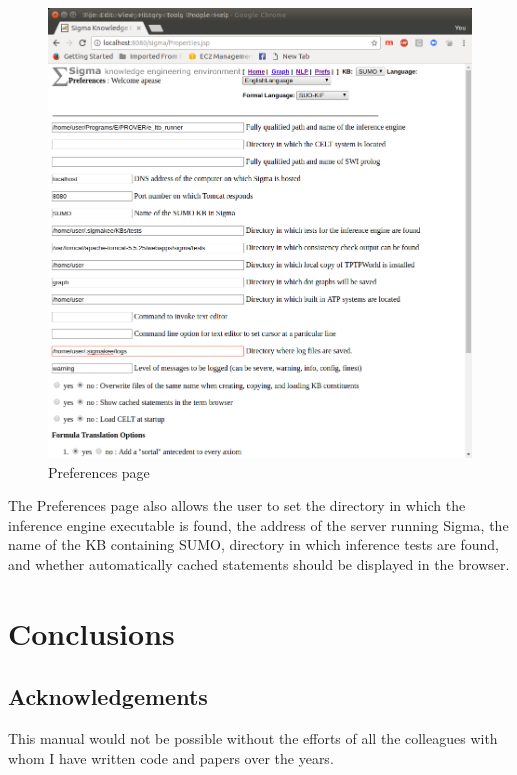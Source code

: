 \documentclass{book}
\begin{document}
\begin{figure}
  \centering
  \includegraphics[width=4.5in]{pictures/Preferences.png}
  \caption{Preferences page}
  \label{fig:Preferences}
\end{figure}

\begin{sloppypar}
The Preferences page also allows the user to set the directory in which the
inference engine executable is found, the address of the server running Sigma,
the name of the KB containing SUMO, directory in which inference tests are
found, and whether automatically cached statements should be displayed in the
browser.
\end{sloppypar}


\chapter{Conclusions}

\section{Acknowledgements}

This manual would not be possible without the efforts of all the colleagues with
whom I have written code and papers over the years. 
\end{document}
